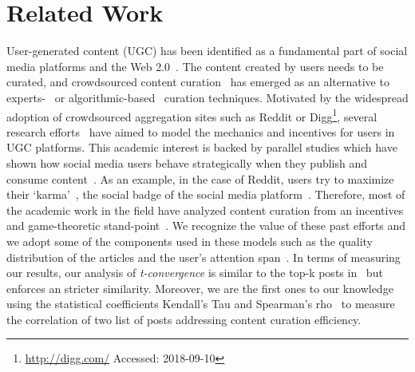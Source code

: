 \section{Related Work}
  User-generated content (UGC) has been identified as a fundamental part of social media platforms and the Web 2.0~\cite{kaplan2010users}. The content created by users needs to be curated, and crowdsourced content curation~\cite{askalidis2013theoretical} has emerged as an alternative to experts-~\cite{stanoevska2012content} or algorithmic-based~\cite{rader2015understanding} curation techniques. Motivated by the widespread adoption of crowdsourced aggregation sites such as Reddit or Digg\footnote{\url{http://digg.com/} Accessed: 2018-09-10}, several research efforts~\cite{das2010ranking,ghosh2011incentivizing} have aimed to model the mechanics and incentives for users in UGC platforms. This academic interest is backed by parallel studies which have shown how
social media users behave strategically when they publish and consume content~\cite{may2014filter}. As an example, in the case of Reddit, users try to maximize their `karma'~\cite{bergstrom2011don}, the social badge of the social media platform~\cite{anderson2013steering}. 
   Therefore, most of the academic work in the field have analyzed content curation from an incentives and game-theoretic stand-point~\cite{ghosh2011incentivizing,das2010ranking,gupte2009news,may2014filter}. We recognize the value of these past efforts and we adopt some of the components used in these models such as the quality distribution of the articles and the user's attention span~\cite{askalidis2013theoretical,ghosh2011incentivizing}. In terms of measuring our results,  our analysis of \textit{t-convergence} is similar to the top-k posts in~\cite{askalidis2013theoretical} but enforces an stricter similarity. Moreover, we are the first ones to our knowledge using the statistical coefficients Kendall's Tau and Spearman's rho~\cite{xu2013comparative,yue2002power} to measure the correlation of two list of posts addressing content curation efficiency. \\
   
